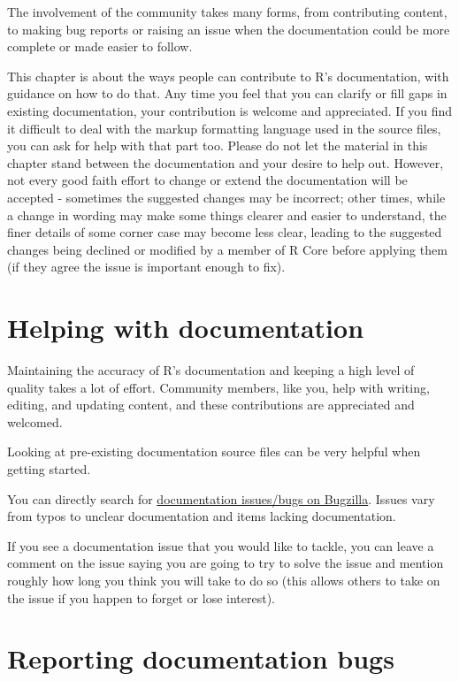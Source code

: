 \documentclass[
  letterpaper,
  DIV=11,
  numbers=noendperiod]{scrreprt}
\begin{document}
The involvement of the community takes many forms, from contributing
content, to making bug reports or raising an issue when the
documentation could be more complete or made easier to follow.

This chapter is about the ways people can contribute to R's
documentation, with guidance on how to do that. Any time you feel that
you can clarify or fill gaps in existing documentation, your
contribution is welcome and appreciated. If you find it difficult to
deal with the markup formatting language used in the source files, you
can ask for help with that part too. Please do not let the material in
this chapter stand between the documentation and your desire to help
out. However, not every good faith effort to change or extend the
documentation will be accepted - sometimes the suggested changes may be
incorrect; other times, while a change in wording may make some things
clearer and easier to understand, the finer details of some corner case
may become less clear, leading to the suggested changes being declined
or modified by a member of R Core before applying them (if they agree
the issue is important enough to fix).

\section{Helping with documentation}\label{helping-with-documentation}

Maintaining the accuracy of R's documentation and keeping a high level
of quality takes a lot of effort. Community members, like you, help with
writing, editing, and updating content, and these contributions are
appreciated and welcomed.

Looking at pre-existing documentation source files can be very helpful
when getting started.

You can directly search for
\href{https://bugs.r-project.org/buglist.cgi?component=Documentation&list_id=22501&product=R&resolution=---}{documentation
issues/bugs on Bugzilla}. Issues vary from typos to unclear
documentation and items lacking documentation.

If you see a documentation issue that you would like to tackle, you can
leave a comment on the issue saying you are going to try to solve the
issue and mention roughly how long you think you will take to do so
(this allows others to take on the issue if you happen to forget or lose
interest).

\section{Reporting documentation
bugs}\label{reporting-documentation-bugs}
\end{document}
